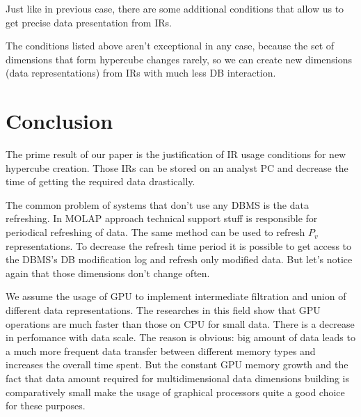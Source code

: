 \documentclass[10pt,a4paper]{article}
\begin{document}


Just like in previous case, there are some additional conditions that allow us to get precise data presentation from IRs.



The conditions listed above aren't exceptional in any case, because the set of dimensions that form hypercube changes rarely, so we can create new dimensions (data representations) from IRs with much less DB interaction.

\section{Conclusion}
The prime result of our paper is the justification of IR usage conditions for new hypercube creation. Those IRs can be stored on an analyst PC and decrease the time of getting the required data drastically.

The common problem of systems that don't use any DBMS is the data refreshing. In MOLAP approach technical support stuff is responsible for periodical refreshing of data. The same method can be used to refresh $P_v$ representations. To decrease the refresh time period it is possible to get access to the DBMS's DB modification log and refresh only modified data. But let's notice again that those dimensions don't change often.

We assume the usage of GPU to implement intermediate filtration and union of different data representations. The researches in this field show that GPU operations are much faster than those on CPU for small data. There is a decrease in perfomance with data scale. The reason is obvious: big amount of data leads to a much more frequent data transfer between different memory types and increases the overall time spent. But the constant GPU memory growth and the fact that data amount required for multidimensional data dimensions building is comparatively small make the usage of graphical processors quite a good choice for these purposes.

\end{document}
